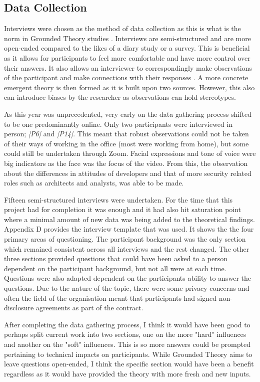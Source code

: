 \subsection{Data Collection}
Interviews were chosen as the method of data collection as this is what is the norm in Grounded Theory studies \cite{geeks}. Interviews are semi-structured and are more open-ended compared to the likes of a diary study or a survey. This is beneficial as it allows for participants to feel more comfortable and have more control over their answers. It also allows an interviewer to correspondingly make observations of the participant and make connections with their responses \cite{geeks}. A more concrete emergent theory is then formed as it is built upon two sources. However, this also can introduce biases by the researcher as observations can hold stereotypes. 
\newline
\par
 As this year was unprecedented, very early on the data gathering process shifted to be one predominantly online. Only two participants were interviewed in person; \textit{[P6]} and \textit{[P14]}. This meant that robust observations could not be taken of their ways of working in the office (most were working from home), but some could still be undertaken through Zoom. Facial expressions and tone of voice were big indicators as the face was the focus of the video. From this, the observation about the differences in attitudes of developers and that of more security related roles such as architects and analysts, was able to be made. 
\newline
\par 
Fifteen semi-structured interviews were undertaken. For the time that this project had for completion it was enough and it had also hit saturation point where a minimal amount of new data was being added to the theoretical findings. Appendix D provides the interview template that was used. It shows the the four primary areas of questioning. The participant background was the only section which remained consistent across all interviews and the rest changed. The other three sections provided questions that could have been asked to a person dependent on the participant background, but not all were at each time. Questions were also adapted dependent on the participants ability to answer the questions. Due to the nature of the topic, there were some privacy concerns and often the field of the organisation meant that participants had signed non-disclosure agreements as part of the contract. 
\newline
\par
After completing the data gathering process, I think it would have been good to perhaps split current work into two sections, one on the more "hard" influences and another on the "soft" influences. This is so more answers could be prompted pertaining to technical impacts on participants. While Grounded Theory aims to leave questions open-ended, I think the specific section would have been a benefit regardless as it would have provided the theory with more fresh and new inputs. 


